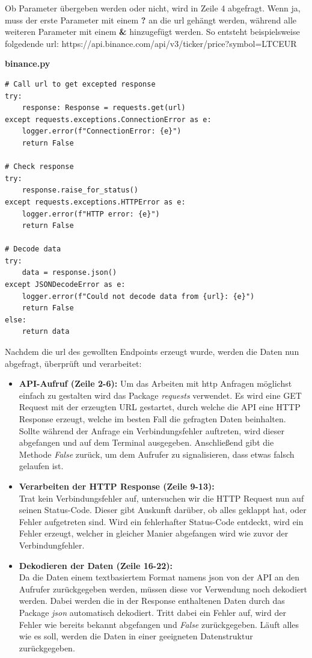 \documentclass[oneside]{ausarbeitung}
\begin{document}
Ob Parameter übergeben werden oder nicht, wird in Zeile 4 abgefragt. Wenn ja, muss der erste Parameter mit einem \textbf{?} an die \ac{url} gehängt werden, während alle weiteren Parameter mit einem \textbf{\&} hinzugefügt werden. So entsteht beispielsweise folgedende \ac{url}: https://api.binance.com/api/v3/ticker/price?symbol=LTCEUR

\lstset{language=Python}
\lstset{frame=lines}
\lstset{basicstyle=\footnotesize}
\textbf{binance.py}
\begin{lstlisting}
# Call url to get excepted response
try:
	response: Response = requests.get(url)
except requests.exceptions.ConnectionError as e:
	logger.error(f"ConnectionError: {e}")
	return False

# Check response
try:
	response.raise_for_status()
except requests.exceptions.HTTPError as e:
	logger.error(f"HTTP error: {e}")
	return False

# Decode data
try:
	data = response.json()
except JSONDecodeError as e:
	logger.error(f"Could not decode data from {url}: {e}")
	return False
else:
	return data
\end{lstlisting}

Nachdem die \ac{url} des gewollten Endpoints erzeugt wurde, werden die Daten nun abgefragt, überprüft und verarbeitet:
\begin{itemize}
	\item \textbf{API-Aufruf (Zeile 2-6):}
		Um das Arbeiten mit \ac{http} Anfragen möglichst einfach zu gestalten
		wird das Package \textit{requests} verwendet. Es wird eine GET Request mit
		der erzeugten URL gestartet, durch welche die API eine HTTP Response
		erzeugt, welche im besten Fall die gefragten Daten beinhalten.
		Sollte während der Anfrage ein Verbindungsfehler auftreten, wird dieser
		abgefangen und auf dem Terminal ausgegeben. Anschließend gibt die Methode
		\textit{False} zurück, um dem Aufrufer zu signalisieren, dass etwas falsch
		gelaufen ist.
	\item \textbf{Verarbeiten der HTTP Response (Zeile 9-13):} \\
		Trat kein Verbindungsfehler auf, untersuchen wir die HTTP Request nun auf
		seinen Status-Code. Dieser gibt Auskunft darüber, ob alles geklappt hat,
		oder Fehler aufgetreten sind. Wird ein fehlerhafter Status-Code entdeckt,
		wird ein Fehler erzeugt, welcher in gleicher Manier abgefangen wird wie
		zuvor der Verbindungfehler.
	\item \textbf{Dekodieren der Daten (Zeile 16-22):} \\
		Da die Daten einem textbasiertem Format namens \ac{json} von der API an 
		den Aufrufer zurückgegeben werden, müssen diese vor Verwendung noch 
		dekodiert werden. Dabei werden die in der Response enthaltenen Daten
		durch das Package \textit{json} automatisch dekodiert. Tritt dabei ein
		Fehler auf, wird der Fehler wie bereits bekannt abgefangen und 
		\textit{False} zurückgegeben. Läuft alles wie es soll, werden die Daten
		in einer geeigneten Datenstruktur zurückgegeben.
\end{itemize}
\end{document}
